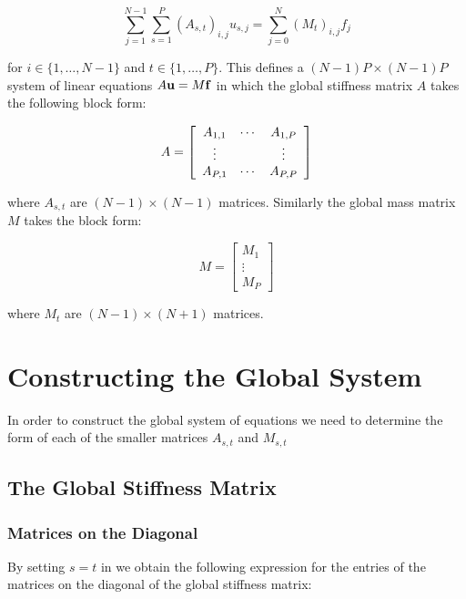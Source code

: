 \begin{equation}
    \sum_{j=1}^{N - 1}\sum_{s=1}^P(A_{s,t})_{i,j}u_{s,j} =
    \sum_{j=0}^N(M_t)_{i,j}f_j
\end{equation}

for $i \in \{1,\ldots,N - 1\}$ and $t \in \{1,\ldots,P\}$. This defines a
$(N - 1)P \times (N - 1)P$ system of linear equations $A\mathbf{u} = M\mathbf{f}$ in
which the global stiffness matrix $A$ takes the following block form:

\begin{equation}
    A = \left[\begin{array}{c c c}
            A_{1,1} & \cdots & A_{1,P} \\
            \vdots & & \vdots \\
            A_{P,1} & \cdots & A_{P,P}
        \end{array}\right]
\end{equation}

where $A_{s,t}$ are $(N - 1) \times (N - 1)$ matrices. Similarly the
global mass matrix $M$ takes the block form:

\begin{equation}
    M = \left[\begin{array}{c}
            M_1 \\
            \vdots \\
            M_P
        \end{array}\right]
\end{equation}

where $M_t$ are $(N - 1) \times (N + 1) $ matrices.

\section{Constructing the Global System}

In order to construct the global system of equations we need to determine the
form of each of the smaller matrices $A_{s,t}$ and $M_{s,t}$

\subsection{The Global Stiffness Matrix}

\subsubsection{Matrices on the Diagonal}

By setting $s=t$ in  we obtain the following
expression for the entries of the matrices on the diagonal of the
global stiffness matrix:

